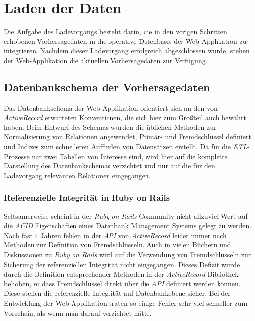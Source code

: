 \section{Laden der Daten}
Die Aufgabe des Ladevorgangs besteht darin, die in den vorigen
Schritten erhobenen Vorhersagedaten in die operative Datenbasis der
Web-Applikation zu integrieren. Nachdem dieser Ladevorgang erfolgreich
abgeschlossen wurde, stehen der Web-Applikation die aktuellen
Vorhersagedaten zur Verfügung. 

\subsection{Datenbankschema der Vorhersagedaten}
Das Datenbankschema der Web-Applikation orientiert sich an den von
\textit{ActiveRecord} erwarteten Konventionen, die sich hier zum
Großteil auch bewährt haben. Beim Entwurf des Schemas wurden die
üblichen Methoden zur Normalisierung von Relationen angewendet,
Primär- und Fremdschlüssel definiert und Indizes zum schnelleren
Auffinden von Datensätzen erstellt. Da für die \textit{ETL}-Prozesse
nur zwei Tabellen von Interesse sind, wird hier auf die komplette
Darstellung des Datenbankschemas verzichtet und nur auf die für den
Ladevorgang relevanten Relationen eingegangen.

\subsubsection{Referenzielle Integrität in Ruby on Rails}
Seltsamerweise scheint in der \textit{Ruby on Rails} Community nicht
allzuviel Wert auf die \textit{ACID}  Eigenschaften eines Datenbank
Management Systems gelegt zu werden. Nach fast 4 Jahren fehlen in der
\textit{API} von \textit{ActiveRecord} leider immer noch Methoden zur
Definition von Fremdschlüsseln. Auch in vielen Büchern und
Diskussionen zu \textit{Ruby on Rails} wird auf die Verwendung von
Fremdschlüsseln zur Sicherung der referenziellen Integrität nicht
eingegangen. Dieses Defizit wurde durch die Definition entsprechender
Methoden in der \textit{ActiveRecord} Bibliothek behoben, so dass
Fremdschlüssel direkt über die \textit{API} definiert werden
können. Diese stellen die referenzielle Integrität auf Datenbankebene
sicher. Bei der Entwicklung der Web-Applikation traten so einige
Fehler sehr viel schneller zum Vorschein, als wenn man darauf
verzichtet hätte.


